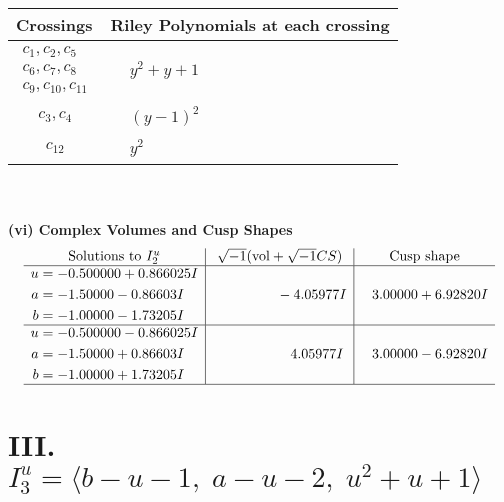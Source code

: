 \documentclass[1p]{elsarticle_modified}
\theoremstyle{definition}
\newcommand{\I}{\sqrt{-1}}
\begin{document}
\begin{tabular}{m{50pt}|m{274pt}}
Crossings & \hspace{64pt}Riley Polynomials at each crossing \\
\hline $$\begin{aligned}c_{1},c_{2},c_{5}\\c_{6},c_{7},c_{8}\\c_{9},c_{10},c_{11}\end{aligned}$$&$\begin{aligned}
&y^2+y+1
\end{aligned}$\\
\hline $$\begin{aligned}c_{3},c_{4}\end{aligned}$$&$\begin{aligned}
&(y-1)^2
\end{aligned}$\\
\hline $$\begin{aligned}c_{12}\end{aligned}$$&$\begin{aligned}
&y^2
\end{aligned}$\\
\hline
\end{tabular}\\~\\
\newpage\flushleft \textbf{(vi) Complex Volumes and Cusp Shapes}
$$\begin{array}{c|c|c}  
\text{Solutions to }I^u_{2}& \I (\text{vol} + \sqrt{-1}CS) & \text{Cusp shape}\\
 \hline 
\begin{aligned}
u &= -0.500000 + 0.866025 I \\
a &= -1.50000 - 0.86603 I \\
b &= -1.00000 - 1.73205 I\end{aligned}
 & \phantom{-0.000000 } -4.05977 I & \phantom{-}3.00000 + 6.92820 I \\ \hline\begin{aligned}
u &= -0.500000 - 0.866025 I \\
a &= -1.50000 + 0.86603 I \\
b &= -1.00000 + 1.73205 I\end{aligned}
 & \phantom{-0.000000 -}4.05977 I & \phantom{-}3.00000 - 6.92820 I\\
 \hline 
 \end{array}$$\newpage\newpage\renewcommand{\arraystretch}{1}
\centering \section*{III. $I^u_{3}= \langle b- u-1,\;a- u-2,\;u^2+u+1 \rangle$}
\end{document}
